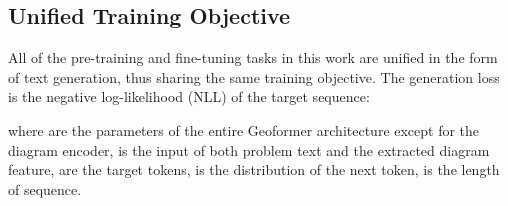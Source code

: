 \documentclass[11pt]{article}
\begin{document}
\subsection{Unified Training Objective}

All of the pre-training and fine-tuning tasks in this work are unified in the form of text generation, thus sharing the same training objective. The generation loss  is the negative log-likelihood (NLL) of the target sequence:
{
\setlength\abovedisplayskip{0.45pt}
\setlength\belowdisplayskip{0.55pt}

}where  are the parameters of the entire Geoformer architecture except for the diagram encoder,  is the input of both problem text and the extracted diagram feature,  are the target tokens,  is the distribution of the next token,  is the length of sequence. 
\end{document}
